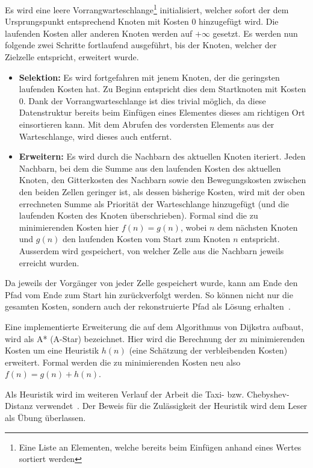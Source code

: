 Es wird eine leere Vorrangwarteschlange\footnote{Eine Liste an Elementen, welche bereits beim Einfügen anhand eines Wertes sortiert werden} initialisiert, welcher sofort der dem Ursprungspunkt entsprechend Knoten mit Kosten 0 hinzugefügt wird. Die laufenden Kosten aller anderen Knoten werden auf $+ \infty$ gesetzt. Es werden nun  folgende zwei Schritte fortlaufend ausgeführt, bis der Knoten, welcher der Zielzelle entspricht, erweitert wurde.~\cite{dijkstra1959note}
\begin{itemize}
  \item \textbf{Selektion:} Es wird fortgefahren mit jenem Knoten, der die geringsten laufenden Kosten hat. Zu Beginn entspricht dies dem Startknoten mit Kosten 0. Dank der Vorrangwarteschlange ist dies trivial möglich, da diese Datenstruktur bereits beim Einfügen eines Elementes dieses am richtigen Ort einsortieren kann. Mit dem Abrufen des vordersten Elements aus der Warteschlange, wird dieses auch entfernt.~\cite{dijkstra1959note}
  \item \textbf{Erweitern:} Es wird durch die Nachbarn des aktuellen Knoten iteriert. Jeden Nachbarn, bei dem die Summe aus den laufenden Kosten des aktuellen Knoten, den Gitterkosten des Nachbarn sowie den Bewegungskosten zwischen den beiden Zellen geringer ist, als dessen bisherige Kosten, wird mit der oben errechneten Summe als Priorität der Warteschlange hinzugefügt (und die laufenden Kosten des Knoten überschrieben). Formal sind die zu minimierenden Kosten hier $f(n)=g(n)$, wobei $n$ dem nächsten Knoten und $g(n)$ den laufenden Kosten vom Start zum Knoten $n$ entspricht. Ausserdem wird gespeichert, von welcher Zelle aus die Nachbarn jeweils erreicht wurden.~\cite{dijkstra1959note}
\end{itemize}

Da jeweils der Vorgänger von jeder Zelle gespeichert wurde, kann am Ende den Pfad vom Ende zum Start hin zurückverfolgt werden. So können nicht nur die gesamten Kosten, sondern auch der rekonstruierte Pfad als Lösung erhalten~\cite{dijkstra1959note}.

Eine implementierte Erweiterung die auf dem Algorithmus von Dijkstra aufbaut, wird als A* (A-Star) bezeichnet. Hier wird die Berechnung der zu minimierenden Kosten um eine Heuristik $h(n)$ (eine Schätzung der verbleibenden Kosten) erweitert. Formal werden die zu minimierenden Kosten neu also $f(n)=g(n)+h(n)$.~\cite{Hart1968}

Als Heuristik wird im weiteren Verlauf der Arbeit die Taxi- bzw. Chebyshev-Distanz verwendet~\cite{cantrell2000modern}. Der Beweis für die Zulässigkeit der Heuristik wird dem Leser als Übung überlassen. 

